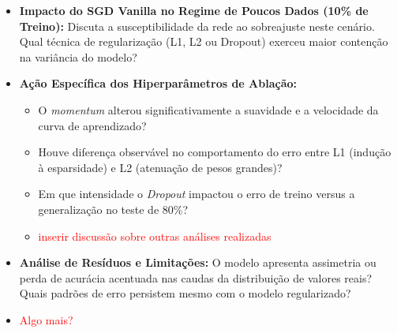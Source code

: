 \documentclass[11pt,a4paper]{article}
\begin{document}
\begin{itemize}
    \item \textbf{Impacto do SGD Vanilla no Regime de Poucos Dados (10\% de Treino):} Discuta a susceptibilidade da rede ao sobreajuste neste cenário. Qual técnica de regularização (L1, L2 ou Dropout) exerceu maior contenção na variância do modelo?
    \item \textbf{Ação Específica dos Hiperparâmetros de Ablação:}
    \begin{itemize}
        \item O \textit{momentum} alterou significativamente a suavidade e a velocidade da curva de aprendizado?
        \item Houve diferença observável no comportamento do erro entre L1 (indução à esparsidade) e L2 (atenuação de pesos grandes)?
        \item Em que intensidade o \textit{Dropout} impactou o erro de treino versus a generalização no teste de 80\%?
        \item \textcolor{red}{inserir discussão sobre outras análises realizadas}
    \end{itemize}
    \item \textbf{Análise de Resíduos e Limitações:} O modelo apresenta assimetria ou perda de acurácia acentuada nas caudas da distribuição de valores reais? Quais padrões de erro persistem mesmo com o modelo regularizado?
    \item \textcolor{red}{Algo mais?}
\end{itemize}
\end{document}
